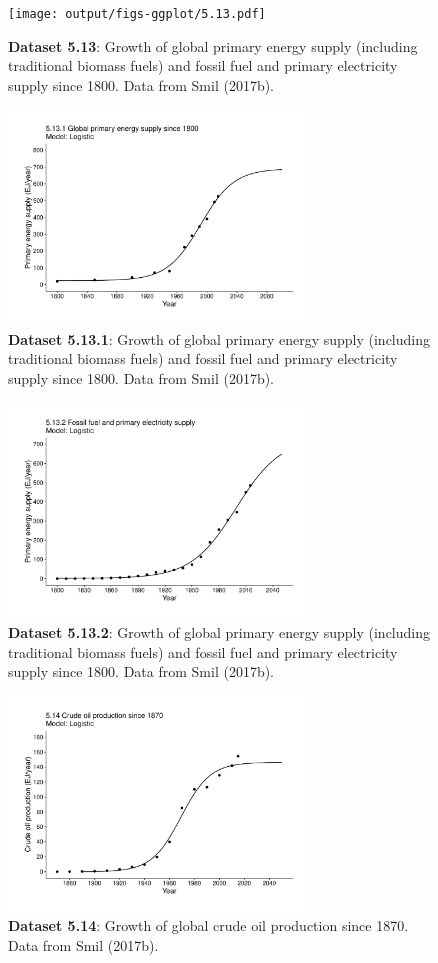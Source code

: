 \documentclass[aps,rmp,preprint,superscriptaddress,10pt,onecolumn]{article}
\begin{document}
\begin{figure}[h]
\texttt{[image: output/figs-ggplot/5.13.pdf]}
\caption{\textbf{Dataset 5.13}: Growth of global primary energy supply (including traditional biomass fuels) and fossil fuel and primary electricity supply since 1800. Data from Smil (2017b). }
\end{figure}
	
\begin{figure}[h]
\includegraphics[width=8cm]{output/figs-ggplot/5.13.1.pdf}
\caption{\textbf{Dataset 5.13.1}: Growth of global primary energy supply (including traditional biomass fuels) and fossil fuel and primary electricity supply since 1800. Data from Smil (2017b). }
\end{figure}
	
\begin{figure}[h]
\includegraphics[width=8cm]{output/figs-ggplot/5.13.2.pdf}
\caption{\textbf{Dataset 5.13.2}: Growth of global primary energy supply (including traditional biomass fuels) and fossil fuel and primary electricity supply since 1800. Data from Smil (2017b). }
\end{figure}
	
\begin{figure}[h]
\includegraphics[width=8cm]{output/figs-ggplot/5.14.pdf}
\caption{\textbf{Dataset 5.14}: Growth of global crude oil production since 1870. Data from Smil (2017b).}
\end{figure}
	
\end{document}
